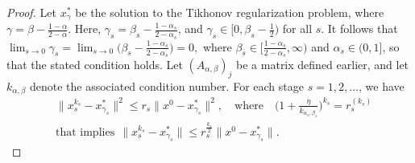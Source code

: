 \documentclass[10pt,a4paper]{amsart}
\begin{document}
\begin{proof}
Let $ x_{\gamma}^* $ be the solution to the Tikhonov regularization problem, where
$
\gamma = \beta - \frac{1 - \alpha}{2 - \alpha}.
$ Here, $ \gamma_s = \beta_s - \frac{1 - \alpha_s}{2 - \alpha_s} $, and $ \gamma_s \in \Big[0, \beta_s - \frac{1}{2}\Big) $ for all $ s $. It follows that
$
\lim_{s \rightarrow0} \gamma_s = \lim_{s \rightarrow0} \Big( \beta_s - \frac{1 - \alpha_s}{2 - \alpha_s} \Big) = 0,
$
where $ \beta_s \in \Big[ \frac{1 - \alpha_s}{2 - \alpha_s}, \infty \Big) $ and $ \alpha_s \in (0,1] $, so that the stated condition holds. Let $ (A_{\alpha, \beta})_j $ be a matrix defined earlier, and let $ k_{\alpha, \beta} $ denote the associated condition number. For each stage $ s = 1, 2, \dots $, we have
\vspace{-1 mm}
\begin{align*}
&\Big\| x_s^{k_s} - x^*_{\gamma_s} \Big\|^2 
\leq r_s \Big\| x^{0} - x^*_{\gamma_s} \Big\|^2, 
\quad \text{where} \quad
\Big(1 + \frac{\eta}{k_{\alpha_s,\beta_s}} \Big)^{k_s} = r_s^{(k_s)}\\
&\text{that implies}~~\Big\| x_s^{k_s} - x^*_{\gamma_s} \Big\| 
\leq r_s^{\frac{k_s}{2}} \Big\| x^{0} - x^*_{\gamma_s} \Big\|.
\end{align*}


\end{proof}
\end{document}
